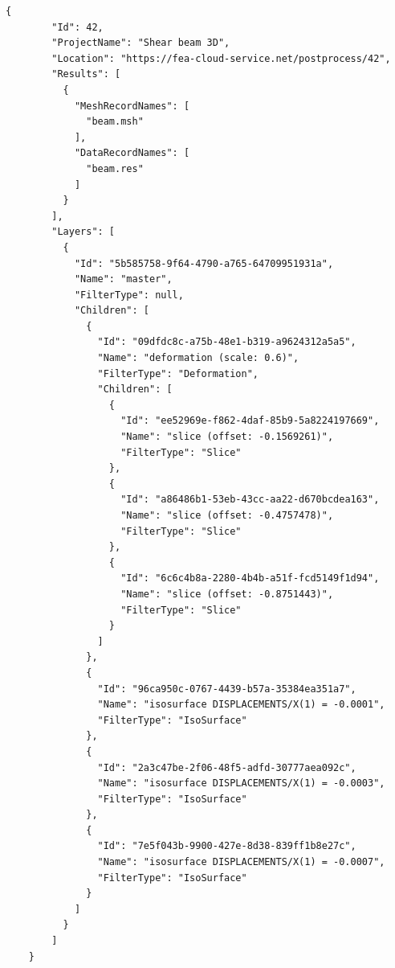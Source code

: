 \begin{lstlisting}[style=json,caption=Example of solution.json document.,label=lst:solution.json]
    {
        "Id": 42,
        "ProjectName": "Shear beam 3D",
        "Location": "https://fea-cloud-service.net/postprocess/42",
        "Results": [
          {
            "MeshRecordNames": [
              "beam.msh"
            ],
            "DataRecordNames": [
              "beam.res"
            ]
          }
        ],
        "Layers": [
          {
            "Id": "5b585758-9f64-4790-a765-64709951931a",
            "Name": "master",
            "FilterType": null,
            "Children": [
              {
                "Id": "09dfdc8c-a75b-48e1-b319-a9624312a5a5",
                "Name": "deformation (scale: 0.6)",
                "FilterType": "Deformation",
                "Children": [
                  {
                    "Id": "ee52969e-f862-4daf-85b9-5a8224197669",
                    "Name": "slice (offset: -0.1569261)",
                    "FilterType": "Slice"
                  },
                  {
                    "Id": "a86486b1-53eb-43cc-aa22-d670bcdea163",
                    "Name": "slice (offset: -0.4757478)",
                    "FilterType": "Slice"
                  },
                  {
                    "Id": "6c6c4b8a-2280-4b4b-a51f-fcd5149f1d94",
                    "Name": "slice (offset: -0.8751443)",
                    "FilterType": "Slice"
                  }
                ]
              },
              {
                "Id": "96ca950c-0767-4439-b57a-35384ea351a7",
                "Name": "isosurface DISPLACEMENTS/X(1) = -0.0001",
                "FilterType": "IsoSurface"
              },
              {
                "Id": "2a3c47be-2f06-48f5-adfd-30777aea092c",
                "Name": "isosurface DISPLACEMENTS/X(1) = -0.0003",
                "FilterType": "IsoSurface"
              },
              {
                "Id": "7e5f043b-9900-427e-8d38-839ff1b8e27c",
                "Name": "isosurface DISPLACEMENTS/X(1) = -0.0007",
                "FilterType": "IsoSurface"
              }
            ]
          }
        ]
    }
    \end{lstlisting}

